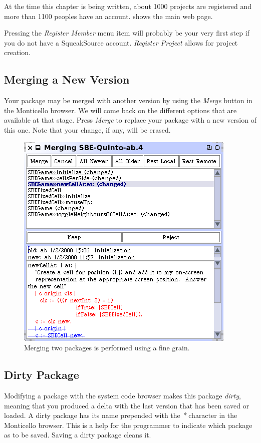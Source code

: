 \documentclass[a4paper,10pt,twoside]{book}
\begin{document}
At the time this chapter is being written, about 1000 projects are registered and more than 1100 peoples have an account.  shows the main web page.

Pressing the \emph{Register Member} menu item will probably be your very first step if you do not have a SqueakSource account. \emph{Register Project} allows for project creation. 


\subsection{Merging a New Version}

Your package may be merged with another version by using the \emph{Merge} button in the Monticello browser. We will come back on the different options that are available at that stage. Press \emph{Merge} to replace your package with a new version of this one. Note that your change, if any, will be erased.

\begin{figure}[ht]\centering
	\includegraphics[width=.75\linewidth]{merger}
	\caption{Merging two packages is performed using a fine grain.}
\end{figure}

\subsection{Dirty Package}

Modifying a package with the system code browser makes this package \emph{dirty}, meaning that you produced a delta with the last version that has been saved or loaded. A dirty package has its name prepended with the \emph{*} character in the Monticello browser. This is a help for the programmer to indicate which package as to be saved. Saving a dirty package cleans it.
\end{document}
